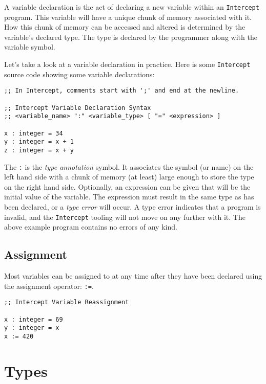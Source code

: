 \documentclass[12pt]{report}
\begin{document}
A variable declaration is the act of declaring a new variable within an \verb|Intercept| program. This variable will have a unique chunk of memory associated with it. How this chunk of memory can be accessed and altered is determined by the variable's declared type. The type is declared by the programmer along with the variable symbol.

Let's take a look at a variable declaration in practice. Here is some \verb|Intercept| source code showing some variable declarations:
\begin{Verbatim}[samepage=true]
;; In Intercept, comments start with ';' and end at the newline.

;; Intercept Variable Declaration Syntax
;; <variable_name> ":" <variable_type> [ "=" <expression> ]

x : integer = 34
y : integer = x + 1
z : integer = x + y
\end{Verbatim}

The \verb|:| is the \emph{type annotation} symbol. It associates the symbol (or name) on the left hand side with a chunk of memory (at least) large enough to store the type on the right hand side. Optionally, an expression can be given that will be the initial value of the variable. The expression must result in the same type as has been declared, or a \emph{type error} will occur. A type error indicates that a program is invalid, and the \verb|Intercept| tooling will not move on any further with it. The above example program contains no errors of any kind.

\section*{Assignment}
\label{subsec:variables-assignment}

Most variables can be assigned to at any time after they have been declared using the assignment operator: \verb|:=|.
\begin{Verbatim}[samepage=true]
;; Intercept Variable Reassignment

x : integer = 69
y : integer = x
x := 420
\end{Verbatim}

\chapter{Types}
\label{sec:types}
\end{document}

